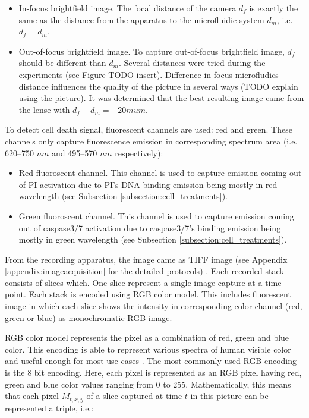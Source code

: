 \documentclass[pdftex,12pt,a4paper]{report}
\begin{document}
\begin{itemize}
\item In-focus brightfield image. The focal distance of the camera $d_f$ is exactly the same as the distance from the apparatus to the microfluidic system $d_m$, i.e. $d_f = d_m$.
\item Out-of-focus brightfield image. To capture out-of-focus brightfield image, $d_f$ should be different than $d_m$. Several distances were tried during the experiments (see Figure TODO insert). Difference in focus-microfludics distance influences the quality of the picture in several ways (TODO explain using the picture). It was determined that the best resulting image came from the lense with $d_f - d_m = -20 mu m$.
\end{itemize}

To detect cell death signal, fluorescent channels are used: red and green. These channels only capture fluorescence emission in corresponding spectrum area (i.e. 620–750 $nm$ and 495–570 $nm$ respectively):

\begin{itemize}
\item Red fluoroscent channel. This channel is used to capture emission coming out of PI activation due to PI's DNA binding emission being mostly in red wavelength (see Subsection \ref{subsection:cell_treatments}).
\item Green fluoroscent channel. This channel is used to capture emission coming out of caspase3/7 activation due to caspase3/7's binding emission being mostly in green wavelength (see Subsection \ref{subsection:cell_treatments}).
\end{itemize}

From the recording apparatus, the image came as TIFF image (see Appendix \ref{appendix:imageacquisition} for the detailed protocols) \cite{loc2006tiff}. Each recorded stack consists of slices which. One slice represent a single image capture at a time point. Each stack is encoded using RGB color model. This includes fluorescent image in which each slice shows the intensity in corresponding color channel (red, green or blue) as monochromatic RGB image. 

RGB color model represents the pixel as a combination of red, green and blue color. This encoding is able to represent various spectra of human visible color and useful enough for most use cases \cite{sonka2014image, jayant1993signal}. The most commonly used RGB encoding is the 8 bit encoding. Here, each pixel is represented as an RGB pixel having red, green and blue color values ranging from 0 to 255. Mathematically, this means that each pixel $M_{t,x,y}$ of a slice captured at time $t$ in this picture can be represented a triple, i.e.:
\end{document}
